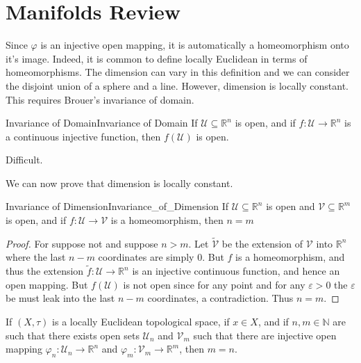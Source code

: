 \section{Manifolds Review}
        Since $\varphi$ is an injective open mapping, it is automatically a
        homeomorphism onto it's image. Indeed, it is common to define locally
        Euclidean in terms of homeomorphisms. The dimension can vary in this
        definition and we can consider the disjoint union of a sphere and a
        line. However, dimension is locally constant. This requires Brouer's
        invariance of domain.
        \begin{ftheorem}{Invariance of Domain}{Invariance of Domain}
            If $\mathcal{U}\subseteq\mathbb{R}^{n}$ is open, and if
            $f:\mathcal{U}\rightarrow\mathbb{R}^{n}$ is a continuous injective
            function, then $f(\mathcal{U})$ is open.
        \end{ftheorem}
        \begin{bproof}
            Difficult.
        \end{bproof}
        We can now prove that dimension is locally constant.
        \begin{ltheorem}{Invariance of Dimension}{Invariance_of_Dimension}
            If $\mathcal{U}\subseteq\mathbb{R}^{n}$ is open and
            $\mathcal{V}\subseteq\mathbb{R}^{m}$ is open, and if
            $f:\mathcal{U}\rightarrow\mathcal{V}$ is a homeomorphism, then
            $n=m$
        \end{ltheorem}
        \begin{proof}
            For suppose not and suppose $n>m$. Let $\tilde{\mathcal{V}}$ be the
            extension of $\mathcal{V}$ into $\mathbb{R}^{n}$ where the last
            $n-m$ coordinates are simply 0. But $f$ is a homeomorphism, and thus
            the extension $\tilde{f}:\mathcal{U}\rightarrow\mathbb{R}^{n}$ is
            an injective continuous function, and hence an open mapping.
            But $f(\mathcal{U})$ is not open since for any point and for any
            $\varepsilon>0$ the $\varepsilon$ be must leak into the last
            $n-m$ coordinates, a contradiction. Thus $n=m$.
        \end{proof}
        \begin{theorem}
            If $(X,\tau)$ is a locally Euclidean topological space, if
            $x\in{X}$, and if $n,m\in\mathbb{N}$ are such that there exists
            open sets $\mathcal{U}_{n}$ and $\mathcal{V}_{m}$ such that there
            are injective open mapping
            $\varphi_{n}:\mathcal{U}_{n}\rightarrow\mathbb{R}^{n}$ and
            $\varphi_{m}:\mathcal{V}_{m}\rightarrow\mathbb{R}^{m}$, then $m=n$.
        \end{theorem}
